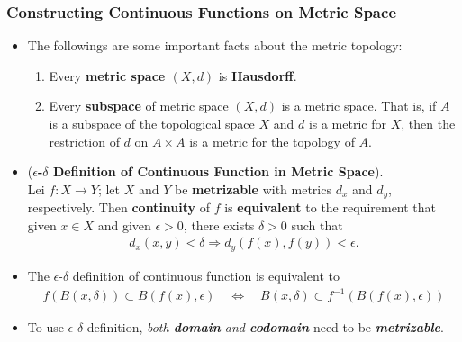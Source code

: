 \documentclass[11pt]{article}
\begin{document}
\subsubsection{Constructing Continuous Functions on Metric Space}
\begin{itemize}
\item The followings are some important facts about the metric topology:
\begin{enumerate}
\item \begin{proposition}
Every \textbf{metric space $(X, d)$} is \textbf{Hausdorff}.
\end{proposition}

\item \begin{proposition}
Every \textbf{subspace} of metric space $(X, d)$ is a metric space. That is, if $A$ is a subspace of the topological space $X$ and $d$ is a metric for $X$, then the restriction of $d$ on $A \times A$ is a metric for the topology of  $A$.
\end{proposition}
\end{enumerate}


\item \begin{theorem} (\textbf{$\epsilon$-$\delta$ Definition of Continuous Function in Metric Space}). \citep{munkres2000topology} \\
Lei $f: X \rightarrow Y$; let $X$ and $Y$ be \textbf{metrizable} with metrics $d_x$ and $d_y$, respectively. Then \textbf{continuity} of $f$ is \textbf{equivalent} to the requirement that given $x \in X$ and given $\epsilon > 0$, there exists $\delta > 0$ such that
\begin{align*}
d_x(x, y) < \delta \Rightarrow d_{y}(f(x), f(y)) < \epsilon.
\end{align*}
\end{theorem}

\item \begin{remark}
The $\epsilon$-$\delta$ definition of continuous function is equivalent to 
\begin{align*}
f(B(x, \delta)) \subset B(f(x), \epsilon) \quad \Leftrightarrow \quad B(x, \delta) \subset f^{-1}(B(f(x), \epsilon))
\end{align*}
\end{remark}

\item \begin{remark}
To use $\epsilon$-$\delta$ definition, \emph{both \textbf{domain} and \textbf{codomain}} need to be \emph{\textbf{metrizable}}.
\end{remark}


\end{itemize}
\end{document}
